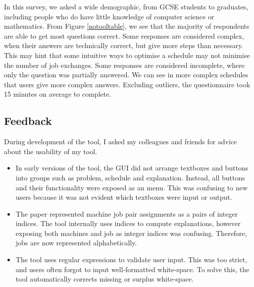 In this survey, we asked a wide demographic, from GCSE students to graduates, including people who do have little knowledge of computer science or mathematics. From Figure \ref{notooltable}, we see that the majority of respondents are able to get most questions correct. Some responses are considered complex, when their answers are technically correct, but give more steps than necessary. This may hint that some intuitive ways to optimise a schedule may not minimise the number of job exchanges. Some responses are considered incomplete, where only the question was partially answered. We can see in more complex schedules that users give more complex answers. Excluding outliers, the questionnaire took 15 minutes on average to complete.

\subsection{Feedback}

During development of the tool, I asked my colleagues and friends for advice about the usability of my tool.

\begin{itemize}
	\item In early versions of the tool, the GUI did not arrange textboxes and buttons into groups such as problem, schedule and explanation. Instead, all buttons and their functionality were exposed as an menu. This was confusing to new users because it was not evident which textboxes were input or output.
	\item The paper \cite{aes} represented machine job pair assignments as a pairs of integer indices. The tool internally uses indices to compute explanations, however exposing both machines and job as integer indices was confusing. Therefore, jobs are now represented alphabetically.
	\item The tool uses regular expressions to validate user input. This was too strict, and users often forgot to input well-formatted white-space. To solve this, the tool automatically corrects missing or surplus white-space.
\end{itemize}